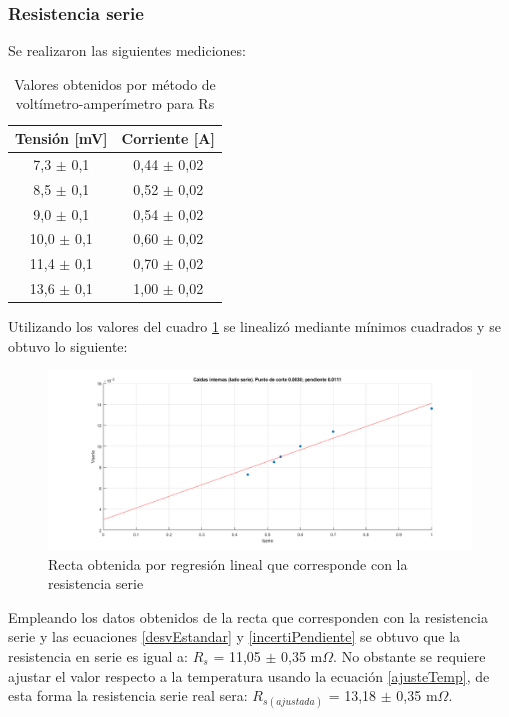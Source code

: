 \documentclass[11pt,letterpaper]{article}     %
\begin{document}
\subsubsection{Resistencia serie}
Se realizaron las siguientes mediciones:
\begin{table}[H]
	\centering
	\caption{Valores obtenidos por método de voltímetro-amperímetro para Rs}
	\label{VoltimetroAmperimetroRs}
	\begin{tabular}{|c|c|}
		\hline
		\textbf{Tensión {[}mV{]}} & \textbf{Corriente {[}A{]}} \\ \hline
		7,3 $\pm$ 0,1            & 0,44 $\pm$ 0,02            \\ \hline
		8,5 $\pm$ 0,1            & 0,52 $\pm$ 0,02            \\ \hline
		9,0 $\pm$ 0,1            & 0,54 $\pm$ 0,02            \\ \hline
		10,0 $\pm$ 0,1            & 0,60 $\pm$ 0,02            \\ \hline
		11,4 $\pm$ 0,1            & 0,70 $\pm$ 0,02             \\ \hline
		13,6 $\pm$ 0,1            & 1,00 $\pm$ 0,02             \\ \hline
	\end{tabular}
\end{table}
Utilizando los valores del cuadro \ref{VoltimetroAmperimetroRs} se linealizó mediante mínimos cuadrados y se obtuvo lo siguiente:
\begin{figure}[H]
	\centering
	\includegraphics[scale=0.5]{./recursos-Lab6/caidasInternasSERIE.png}
	\caption{Recta obtenida por regresión lineal que corresponde con la resistencia serie}
	\label{fig:rectaResistenciaSerie}
\end{figure}
Empleando los datos obtenidos de la recta que corresponden con la resistencia serie y las ecuaciones \ref{desvEstandar} y \ref{incertiPendiente} se obtuvo que la resistencia en serie es igual a: $R_{s}$ = 11,05 $\pm$ 0,35 m$\Omega$.  No obstante se requiere ajustar el valor respecto a la temperatura usando la ecuación \ref{ajusteTemp}, de esta forma la resistencia serie real sera: $R_{s(ajustada)}$ = 13,18 $\pm$ 0,35 m$\Omega$.
\end{document}
